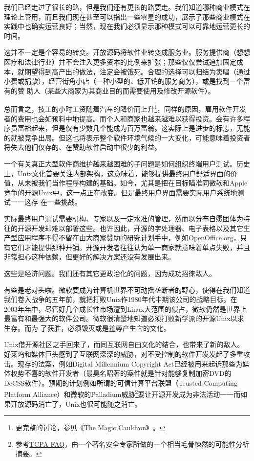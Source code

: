 \documentclass[12pt,oneside]{ctexbook}
\begin{document}
\begin{common-format}
我们已经走过了很长的路，但是我们还有更长的路要走。我们知道哪种商业模式在理论上管用，而且我们现在甚至可以指出一些零星的成功，展示了那些商业模式在实践中也确实运营良好；当然，现在我们必须显示那种模式可以可靠地运营更长的时间。

这并不一定是个容易的转变。开放源码将软件业转变成服务业。服务提供商（想想医疗和法律行业）并不会注入更多资本的比例来扩张；那些仅仅尝试追加固定成本，就期望得到高产出的做法，注定会被饿死。合理的选择可以归结为卖唱（通过小费或捐款），经营街角小店（一种小型的、低开销的服务商务），或是找到一个富有的赞
助人（某些大商家为其商业目的而需要使用及修改开源软件）。

总而言之，技工的小时工资随着汽车的降价而上升\footnote{更完整的讨论，参见《The Magic Cauldron》~\cite{Raymond01}。}，同样的原因，雇用软件开发者的费用也会如预料中地提高。而个人和商家也越来越难以获得投资。会有许多程序员富裕起来，但是仅有少数几个能成为百万富翁。这实际上是进步的标志，无能的就被竞争出局。但这也将表示整个软件环境气候的一大变化，可能意味着投资者将失去他们仅存的、在赞助软件启动中很少的利益。

一个有关真正大型软件商维护越来越困难的子问题是如何组织终端用户测试。历史上，Unix文化首要关注内部架构，这意味着，能够提供最终用户舒适界面的价值，从未被我们当作程序构建的基础。如今，尤其是把在目标瞄准同微软和Apple竞争的开源Unix中，这一点正在改变。但是最终用户界面需要实际用户系统地测试一一这存
在一些挑战。

实际最终用户测试需要机构、专家以及一定水准的管理，然而以分布自愿团体为特征的开源开发却难以部署这些。也许因此，开源的字处理器、电子表格以及其它生产型应用程序不得不留在由大商家赞助的研究计划手中，例如OpenOffice.org，只有它们才能提供那种开销。开源开发者往往认为单一商家就意味着单点失败，并且非常担心这种依赖，但更好的解决方案还没有发展出来。

这些是经济问题。我们还有其它更政治化的问题，因为成功招徕敌人。

有些是老对头啦。微软要成为计算机世界不可动摇垄断者的野心，使得在我们知道我们卷入战争的五年前，就把打败Unix作1980年代中期该公司的战略目标。在2003年年中，尽管好几个成长性市场遭到Linux大范围的侵占，微软仍然是世界上最富有和最强大的软件公司。微软很清楚地知道必须打败新学派的开源Unix以求生存。而为
了获胜，必须毁灭或是羞辱产生它的文化。

Unix借开源社区之手回来了，而同互联网自由文化的结合，也带来了新的敌人。好莱坞和媒体巨头感到了互联网深深的威胁，对不受控制的软件开发发起了多重攻击。现存的法案，例如Digital Millennium Copyright Act已经被用来起诉那些为媒体权势不喜的软件开发者（最臭名昭著的案件就是针对能够复制加密DVD的DeCSS软件）。预期的计划例如所谓的可信计算平台联盟（Trusted Computing Platform Alliance）和微软的Palladium威胁\footnote{参考\href{http://www.cl.cam.ac.uk/~rja14/tcpa-faq.html}{TCPA FAQ}，由一个著名安全专家所做的一个相当毛骨悚然的可能性分析摘要。}要让开源开发成为非法活动一一而如果开放源码消亡了，Unix也很可能随之消亡。


\end{common-format}
\end{document}
